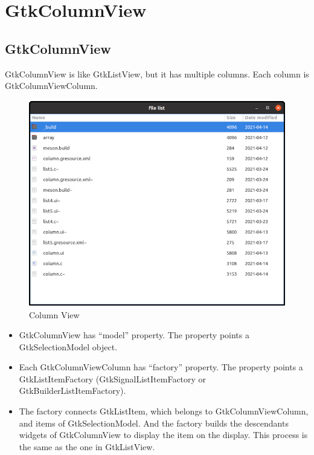 \hypertarget{gtkcolumnview}{%
\section{GtkColumnView}\label{gtkcolumnview}}

\hypertarget{gtkcolumnview-1}{%
\subsection{GtkColumnView}\label{gtkcolumnview-1}}

GtkColumnView is like GtkListView, but it has multiple columns. Each
column is GtkColumnViewColumn.

\begin{figure}
\centering
\includegraphics[width=11.3cm,height=9cm]{../image/column_view.png}
\caption{Column View}
\end{figure}

\begin{itemize}
\tightlist
\item
  GtkColumnView has ``model'' property. The property points a
  GtkSelectionModel object.
\item
  Each GtkColumnViewColumn has ``factory'' property. The property points
  a GtkListItemFactory (GtkSignalListItemFactory or
  GtkBuilderListItemFactory).
\item
  The factory connects GtkListItem, which belongs to
  GtkColumnViewColumn, and items of GtkSelectionModel. And the factory
  builds the descendants widgets of GtkColumnView to display the item on
  the display. This process is the same as the one in GtkListView.
\end{itemize}

